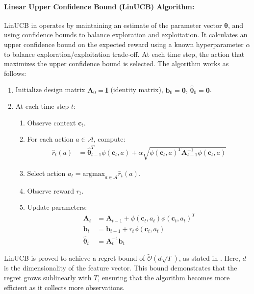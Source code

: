 \paragraph{Linear Upper Confidence Bound (LinUCB) Algorithm:}
LinUCB in \citet{dani2008stochastic, li2010contextual} operates by maintaining an estimate of the parameter vector $\boldsymbol{\theta}$, and using confidence bounds to balance exploration and exploitation. It calculates an upper confidence bound on the expected reward using a known hyperparameter $\alpha$ to balance exploration/exploitation trade-off. At each time step, the action that maximizes the upper confidence bound is selected. The algorithm works as follows:
    \begin{enumerate}
        \item Initialize design matrix $\mathbf{A}_0 = \mathbf{I}$ (identity matrix), $\mathbf{b}_0 = \mathbf{0}$, $\hat{\boldsymbol{\theta}}_0 = \mathbf{0}$.
        \item At each time step $t$:
          \begin{enumerate}
              \item Observe context $\mathbf{c}_t$.
              \item For each action $a \in \mathcal{A}$, compute:
              \begin{align*}
                \hat{r}_t(a) &= \hat{\boldsymbol{\theta}}_{t-1}^T \phi(\mathbf{c}_t, a) + \alpha \sqrt{ \phi(\mathbf{c}_t, a)^T \mathbf{A}_{t-1}^{-1} \phi(\mathbf{c}_t, a)}
              \end{align*}
              \item Select action $a_t = \text{argmax}_{a \in \mathcal{A}} \hat{r}_t(a)$.
              \item Observe reward $r_t$.
              \item Update parameters:
              \begin{align*}
                  \mathbf{A}_t &= \mathbf{A}_{t-1} + \phi(\mathbf{c}_t, a_t) \phi(\mathbf{c}_t, a_t)^T \\
                  \mathbf{b}_t &= \mathbf{b}_{t-1} + r_t \phi(\mathbf{c}_t, a_t) \\
                  \hat{\boldsymbol{\theta}}_t &= \mathbf{A}_t^{-1} \mathbf{b}_t
              \end{align*}
          \end{enumerate}
    \end{enumerate}
LinUCB is proved to achieve a regret bound of \( \tilde{\mathcal{O}}(d \sqrt{T}) \), as stated in \citet{dani2008stochastic}. Here, \( d \) is the dimensionality of the feature vector. This bound demonstrates that the regret grows sublinearly with \( T \), ensuring that the algorithm becomes more efficient as it collects more observations.

